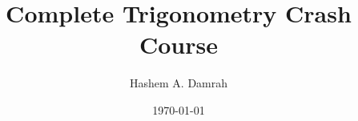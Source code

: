 \documentclass{report}
\title{Complete Trigonometry Crash Course}
\author{Hashem A. Damrah}
\date{\today}
\begin{document}
  \maketitle
  \mbox{}\newpage
  \tableofcontents
  \newpage
  
\end{document}

